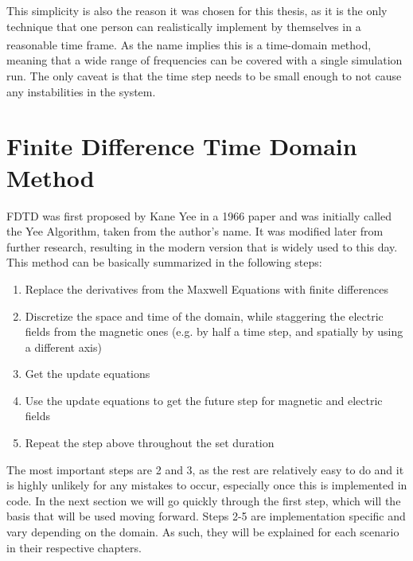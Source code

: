 This simplicity is also the reason it was chosen for this thesis, as it is the only technique that one person can realistically implement by themselves in a reasonable time frame.\textsuperscript{\cite{davidson2010computational}} As the name implies this is a time-domain method, meaning that a wide range of frequencies can be covered with a single simulation run. The only caveat is that the time step needs to be small enough to not cause any instabilities in the system.


\section{Finite Difference Time Domain Method}

FDTD was first proposed by Kane Yee in a 1966 paper and was initially called the Yee Algorithm, taken from the author's name. It was modified later from further research, resulting in the modern version that is widely used to this day. This method can be basically summarized in the following steps:

\begin{enumerate}
	\item Replace the derivatives from the Maxwell Equations with finite differences
	\item Discretize the space and time of the domain, while staggering the electric fields from the magnetic ones (e.g. by half a time step, and spatially by using a different axis)
	\item Get the update equations
	\item Use the update equations to get the future step for magnetic and electric fields
	\item Repeat the step above throughout the set duration
\end{enumerate}

The most important steps are 2 and 3, as the rest are relatively easy to do and it is highly unlikely for any mistakes to occur, especially once this is implemented in code. In the next section we will go quickly through the first step, which will the basis that will be used moving forward. Steps 2-5 are implementation specific and vary depending on the domain. As such, they will be explained for each scenario in their respective chapters.

